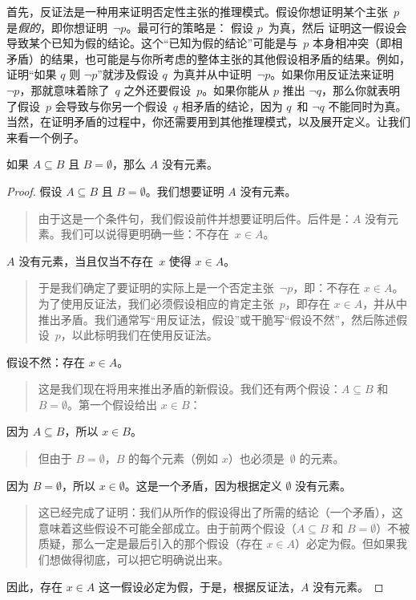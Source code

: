 \documentclass[../../../include/open-logic-section]{subfiles}
\begin{document}


首先，反证法是一种用来证明否定性主张的推理模式。假设你想证明某个主张~$p$ 是\emph{假的}，即你想证明~$\lnot p$。最可行的策略是： 假设 $p$~为真，然后 证明这一假设会导致某个已知为假的结论。这个“已知为假的结论”可能是与~$p$ 本身相冲突（即相矛盾）的结果，也可能是与你所考虑的整体主张的其他假设相矛盾的结果。例如，证明“如果 $q$ 则 $\lnot p$”就涉及假设 $q$~为真并从中证明~$\lnot p$。如果你用反证法来证明 $\lnot p$，那就意味着除了~$q$ 之外还要假设~$p$。如果你能从 $p$ 推出 $\lnot q$，那么你就表明了假设~$p$ 会导致与你另一个假设~$q$ 相矛盾的结论，因为 $q$~和 $\lnot q$ 不能同时为真。当然，在证明矛盾的过程中，你还需要用到其他推理模式，以及展开定义。让我们来看一个例子。

\begin{prop}
  如果 $A \subseteq B$ 且 $B = \emptyset$，那么 $A$ 没有元素。
\end{prop}

\begin{proof}
  假设 $A \subseteq B$ 且 $B = \emptyset$。我们想要证明 $A$ 没有元素。
  \begin{quote}
    由于这是一个条件句，我们假设前件并想要证明后件。后件是：$A$ 没有元素。我们可以说得更明确一些：不存在~$x \in A$。
  \end{quote}
  $A$ 没有元素，当且仅当不存在~$x$ 使得 $x \in A$。
  \begin{quote}
    于是我们确定了要证明的实际上是一个否定主张~$\lnot p$，即：不存在 $x \in A$。为了使用反证法，我们必须假设相应的肯定主张~$p$，即存在 $x \in A$，并从中推出矛盾。我们通常写“用反证法，假设”或干脆写“假设不然”，然后陈述假设~$p$，以此标明我们在使用反证法。
  \end{quote}
  假设不然：存在 $x \in A$。
  \begin{quote}
    这是我们现在将用来推出矛盾的新假设。我们还有两个假设：$A \subseteq B$ 和 $B = \emptyset$。第一个假设给出 $x \in B$：
  \end{quote}
  因为 $A \subseteq B$，所以 $x \in B$。
  \begin{quote}
    但由于 $B = \emptyset$，$B$ 的每个元素（例如 $x$）也必须是~$\emptyset$ 的元素。
  \end{quote}
  因为 $B = \emptyset$，所以 $x \in \emptyset$。这是一个矛盾，因为根据定义 $\emptyset$ 没有元素。
  \begin{quote}
    这已经完成了证明：我们从所作的假设得出了所需的结论（一个矛盾），这意味着这些假设不可能全部成立。由于前两个假设（$A \subseteq B$ 和 $B = \emptyset$）不被质疑，那么一定是最后引入的那个假设（存在 $x \in A$）必定为假。但如果我们想做得彻底，可以把它明确说出来。
  \end{quote}
  因此，存在 $x \in A$ 这一假设必定为假，于是，根据反证法，$A$ 没有元素。
\end{proof}
\end{document}
